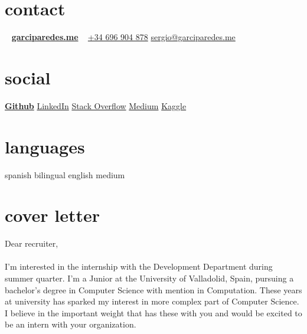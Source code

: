 \documentclass[]{friggeri-cv} %
\begin{document}


    \begin{aside} %

        \section{contact}
            ~
            \href{http://garciparedes.me}{\textbf{garciparedes.me}}
            ~
            \href{tel:+34 696 904 878}{+34 696 904 878}
            \href{mailto:sergio@garciparedes.me}{sergio@garciparedes.me}
        \section{social}
            \href{https://github.com/garciparedes}{\quad{\color{red} $\varheartsuit$}\quad\textbf{Github}\quad\faGithub }
            \href{https://es.linkedin.com/in/garciparedes/en}{LinkedIn\quad\faLinkedin }
            \href{http://stackoverflow.com/users/3921457/garciparedes}{Stack Overflow\quad\faStackOverflow }
            \href{https://medium.com/@garciparedes}{Medium\quad\faMedium }
            \href{https://www.kaggle.com/garciparedes}{Kaggle\quad\faTrophy }
        \section{languages}
            spanish bilingual
            english medium
    \end{aside}




  \section{cover letter}

    \noindent Dear recruiter,

    \paragraph{}
    I'm interested in the internship with the Development Department during summer quarter. I'm a Junior at the University of Valladolid, Spain, pursuing a bachelor's degree in Computer Science with mention in Computation. These years at university has sparked my interest in more complex part of Computer Science. I believe in the important weight that has these with you and would be excited to be an intern with your organization.
\end{document}
